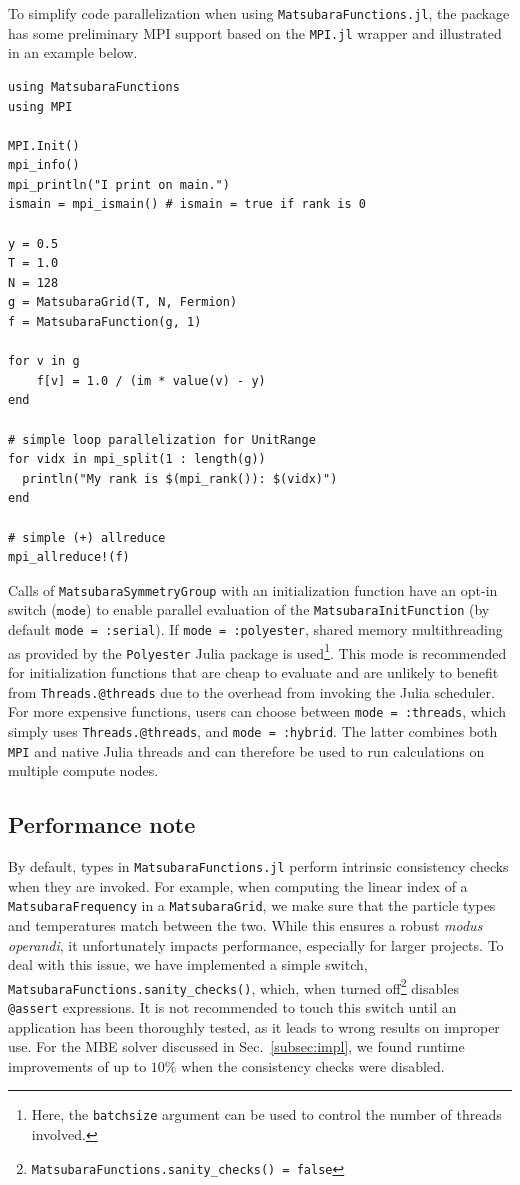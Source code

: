 \documentclass{SciPost}
\begin{document}
To simplify code parallelization when using \texttt{MatsubaraFunctions.jl}, the package has some preliminary MPI support based on the \texttt{MPI.jl} wrapper and illustrated in an example below.
%
\begin{verbatim}
using MatsubaraFunctions 
using MPI 

MPI.Init()
mpi_info()
mpi_println("I print on main.")
ismain = mpi_ismain() # ismain = true if rank is 0

y = 0.5
T = 1.0
N = 128
g = MatsubaraGrid(T, N, Fermion)
f = MatsubaraFunction(g, 1)

for v in g
    f[v] = 1.0 / (im * value(v) - y)
end 

# simple loop parallelization for UnitRange
for vidx in mpi_split(1 : length(g))
  println("My rank is $(mpi_rank()): $(vidx)")
end

# simple (+) allreduce
mpi_allreduce!(f)
\end{verbatim}
%
Calls of \texttt{MatsubaraSymmetryGroup} with an initialization function have an opt-in switch ($\texttt{mode}$) to enable parallel evaluation of the \texttt{MatsubaraInitFunction} (by default \texttt{mode = :serial}). If \texttt{mode = :polyester}, shared memory multithreading as provided by the \texttt{Polyester} Julia package \cite{polyester} is used\footnote{Here, the \texttt{batchsize} argument can be used to control the number of threads involved.}. This mode is recommended for initialization functions that are cheap to evaluate and are unlikely to benefit from \texttt{Threads.@threads} due to the overhead from invoking the Julia scheduler. For more expensive functions, users can choose between \texttt{mode = :threads}, which simply uses \texttt{Threads.@threads}, and \texttt{mode = :hybrid}. The latter combines both \texttt{MPI} and native Julia threads and can therefore be used to run calculations on multiple compute nodes.

\subsection{Performance note}

By default, types in \texttt{MatsubaraFunctions.jl} perform intrinsic consistency checks when they are invoked. For example, when computing the linear index of a \texttt{MatsubaraFrequency} in a \texttt{MatsubaraGrid}, we make sure that the particle types and temperatures match between the two. While this ensures a robust \textsl{modus operandi}, it unfortunately impacts performance, especially for larger projects. To deal with this issue, we have implemented a simple switch, \texttt{MatsubaraFunctions.sanity\_checks()}, which, when turned off\footnote{ \texttt{MatsubaraFunctions.sanity\_checks() = false}} disables \texttt{@assert} expressions. It is not recommended to touch this switch until an application has been thoroughly tested, as it leads to wrong results on improper use. For the MBE solver discussed in Sec.~\ref{subsec:impl}, we found runtime improvements of up to $10\%$ when the consistency checks were disabled.
\end{document}
